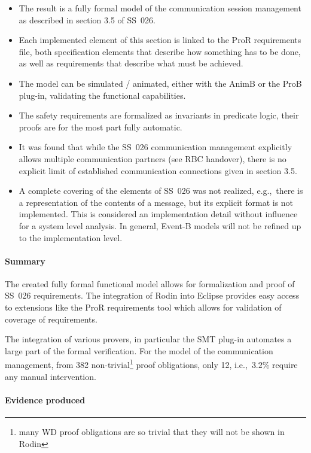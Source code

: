 \begin{itemize}
\item The result is a fully formal model of the communication session management
  as described in section 3.5 of SS~026.
\item Each implemented element of this section is linked to the ProR
  requirements file, both specification elements that describe how something has
  to be done, as well as requirements that describe what must be achieved.
\item The model can be simulated / animated, either with the AnimB or the ProB
  plug-in, validating the functional capabilities.
\item The safety requirements are formalized as invariants in predicate logic,
  their proofs are for the most part fully automatic.
\item It was found that while the SS~026 communication management explicitly
  allows multiple communication partners (see RBC handover), there is no
  explicit limit of established communication connections given in section 3.5.
\item A complete covering of the elements of SS~026 was not realized, e.g.,\
  there is a representation of the contents of a message, but its explicit
  format is not implemented. This is considered an implementation detail without
  influence for a system level analysis. In general, Event-B models will not be
  refined up to the implementation level.
\end{itemize}

\paragraph{Summary}

The created fully formal functional model allows for formalization and proof of
SS~026 requirements. The integration of Rodin into Eclipse provides easy access
to extensions like the ProR requirements tool which allows for validation of
coverage of requirements.

The integration of various provers, in particular the SMT plug-in automates a
large part of the formal verification. For the model of the communication
management, from 382 non-trivial\footnote{many WD proof obligations are so
  trivial that they will not be shown in Rodin} proof obligations, only 12,
i.e.,\ $3.2\%$ require any manual intervention.

\paragraph{Evidence produced}
\label{sec:evidence-produced}

